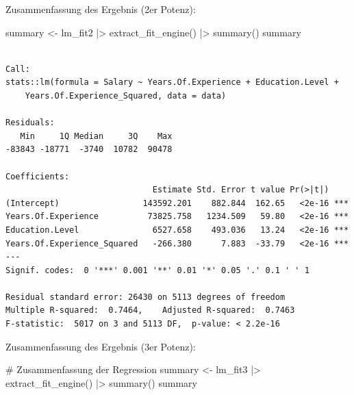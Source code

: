 \documentclass[
  letterpaper,
  DIV=11,
  numbers=noendperiod]{scrartcl}
\newenvironment{Shaded}{\begin{snugshade}}{\end{snugshade}}
\newcommand{\CommentTok}[1]{\textcolor[rgb]{0.37,0.37,0.37}{#1}}
\newcommand{\FunctionTok}[1]{\textcolor[rgb]{0.28,0.35,0.67}{#1}}
\newcommand{\NormalTok}[1]{\textcolor[rgb]{0.00,0.23,0.31}{#1}}
\newcommand{\OtherTok}[1]{\textcolor[rgb]{0.00,0.23,0.31}{#1}}
\newcommand{\SpecialCharTok}[1]{\textcolor[rgb]{0.37,0.37,0.37}{#1}}
\begin{document}
Zusammenfassung des Ergebnis (2er Potenz):

\begin{Shaded}
\begin{Highlighting}[]
\NormalTok{summary }\OtherTok{\textless{}{-}}\NormalTok{ lm\_fit2 }\SpecialCharTok{|\textgreater{}} \FunctionTok{extract\_fit\_engine}\NormalTok{() }\SpecialCharTok{|\textgreater{}} \FunctionTok{summary}\NormalTok{()}
\NormalTok{summary}
\end{Highlighting}
\end{Shaded}

\begin{verbatim}

Call:
stats::lm(formula = Salary ~ Years.Of.Experience + Education.Level + 
    Years.Of.Experience_Squared, data = data)

Residuals:
   Min     1Q Median     3Q    Max 
-83843 -18771  -3740  10782  90478 

Coefficients:
                              Estimate Std. Error t value Pr(>|t|)    
(Intercept)                 143592.201    882.844  162.65   <2e-16 ***
Years.Of.Experience          73825.758   1234.509   59.80   <2e-16 ***
Education.Level               6527.658    493.036   13.24   <2e-16 ***
Years.Of.Experience_Squared   -266.380      7.883  -33.79   <2e-16 ***
---
Signif. codes:  0 '***' 0.001 '**' 0.01 '*' 0.05 '.' 0.1 ' ' 1

Residual standard error: 26430 on 5113 degrees of freedom
Multiple R-squared:  0.7464,    Adjusted R-squared:  0.7463 
F-statistic:  5017 on 3 and 5113 DF,  p-value: < 2.2e-16
\end{verbatim}

Zusammenfassung des Ergebnis (3er Potenz):

\begin{Shaded}
\begin{Highlighting}[]
\CommentTok{\# Zusammenfassung der Regression}
\NormalTok{summary }\OtherTok{\textless{}{-}}\NormalTok{ lm\_fit3 }\SpecialCharTok{|\textgreater{}} \FunctionTok{extract\_fit\_engine}\NormalTok{() }\SpecialCharTok{|\textgreater{}} \FunctionTok{summary}\NormalTok{()}
\NormalTok{summary}
\end{Highlighting}
\end{Shaded}
\end{document}
